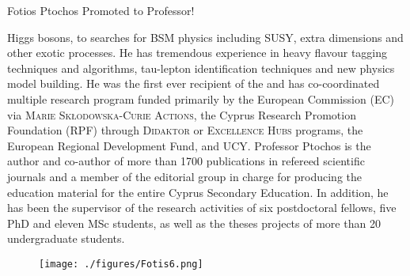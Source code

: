 \begin{headline}[enhanced, tikz={rotate=0}]{Fotios Ptochos Promoted to Professor!}
\begin{multicols}{2}
    Higgs bosons, to searches for BSM physics including SUSY, extra
    dimensions and other exotic processes. He has tremendous experience in
    heavy flavour tagging techniques and algorithms, tau-lepton
    identification techniques and new physics model building. 
    He was the first ever recipient of the  and has co-coordinated multiple research program
    funded primarily by the European Commission (EC) via \textsc{Marie
    Skłodowska-Curie Actions},  the Cyprus Research Promotion
    Foundation (RPF) through \textsc{Didaktor} or \textsc{Excellence
      Hubs} programs, the European Regional Development Fund, and
    UCY. Professor Ptochos is the author and co-author of more than 
    1700 publications in refereed scientific journals and a member of the
    editorial group in charge for producing the education material
    for the entire Cyprus Secondary Education. In addition, he has
    been the supervisor of the research activities of six postdoctoral
    fellows, five PhD and eleven MSc students, as well as the theses
    projects of more than 20 undergraduate students. 

    \begin{figure}
      \begin{center}
        \vspace{-0.2in}
        \leavevmode
        \texttt{[image: ./figures/Fotis6.png]}
      \end{center}
    \end{figure}
  \end{multicols}
\end{headline}

